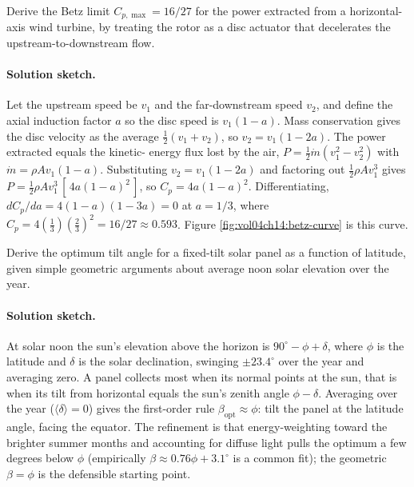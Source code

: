 \begin{exercise}
Derive the Betz limit $C_{p,\max} = 16/27$ for the power extracted
from a horizontal-axis wind turbine, by treating the rotor as a
disc actuator that decelerates the upstream-to-downstream flow.
\paragraph{Solution sketch.}
Let the upstream speed be $v_1$ and the far-downstream speed $v_2$, and
define the axial induction factor $a$ so the disc speed is $v_1(1-a)$.
Mass conservation gives the disc velocity as the average $\tfrac12(v_1
+v_2)$, so $v_2 = v_1(1-2a)$. The power extracted equals the kinetic-
energy flux lost by the air, $P = \tfrac12\dot{m}(v_1^2 - v_2^2)$ with
$\dot{m} = \rho A v_1(1-a)$. Substituting $v_2 = v_1(1-2a)$ and
factoring out $\tfrac12\rho A v_1^3$ gives $P = \tfrac12\rho A
v_1^3\,[\,4a(1-a)^2\,]$, so $C_p = 4a(1-a)^2$. Differentiating,
$dC_p/da = 4(1-a)(1-3a) = 0$ at $a = 1/3$, where $C_p = 4(\tfrac13)
(\tfrac23)^2 = 16/27 \approx 0.593$. Figure
\ref{fig:vol04ch14:betz-curve} is this curve.
\end{exercise}

\begin{exercise}
Derive the optimum tilt angle for a fixed-tilt solar panel as a
function of latitude, given simple geometric arguments about
average noon solar elevation over the year.
\paragraph{Solution sketch.}
At solar noon the sun's elevation above the horizon is $90^\circ -
\phi + \delta$, where $\phi$ is the latitude and $\delta$ is the solar
declination, swinging $\pm 23.4^\circ$ over the year and averaging zero.
A panel collects most when its normal points at the sun, that is when
its tilt from horizontal equals the sun's zenith angle $\phi - \delta$.
Averaging over the year ($\langle\delta\rangle = 0$) gives the
first-order rule $\beta_{\text{opt}} \approx \phi$: tilt the panel at
the latitude angle, facing the equator. The refinement is that
energy-weighting toward the brighter summer months and accounting for
diffuse light pulls the optimum a few degrees below $\phi$ (empirically
$\beta \approx 0.76\phi + 3.1^\circ$ is a common fit); the geometric
$\beta = \phi$ is the defensible starting point.
\end{exercise}

